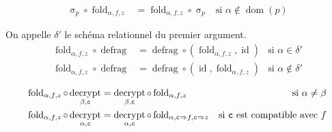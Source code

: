 \documentclass[french]{article}
\DeclareMathOperator{\sel}{\sigma}
\DeclareMathOperator{\defrag}{defrag}
\DeclareMathOperator{\decrypt}{decrypt}
\DeclareMathOperator{\id}{id}
\DeclareMathOperator{\dom}{dom}
\newcommand\typeT[1]{\text{\ttfamily #1}}
\newcommand{\decryptArgs}[2]{\decrypt_{#1 , \typeT{#2}}}
\newcommand{\selP}{\sel_p}
\newcommand{\decryptCAlpha}{\decryptArgs{\alpha}{c}}
\newcommand{\fold}[3]{\operatorname{fold}_{#1, #2, #3}}
\newcommand{\foldAlphafz}{\fold{\alpha}{f}{z}}
\begin{document}
\begin{align}
\selP \circ \foldAlphafz & = \foldAlphafz \circ \selP
& \text{si $\alpha \notin \dom(p)$}
\end{align}

On appelle $\delta'$ le schéma relationnel du premier argument.
\begin{align}
\foldAlphafz \circ \defrag
& = \defrag \circ (\foldAlphafz, \id)
& \text{si $\alpha \in \delta'$} \\
\foldAlphafz \circ \defrag
& = \defrag \circ (\id, \foldAlphafz)
& \text{si $\alpha \notin \delta'$}
\end{align}

\begin{align}
\foldAlphafz \circ \decryptArgs{\beta}{c}
& = \decryptArgs{\beta}{c} \circ \foldAlphafz
& \text{si $\alpha \neq \beta$} \\
\foldAlphafz \circ \decryptCAlpha
& = \decryptCAlpha \circ \fold{\alpha}{\typeT{c} \Rightarrow f}{\typeT{c} \Rightarrow z}
& \text{si $\typeT{c}$ est compatible avec $f$}
\end{align}
\end{document}
